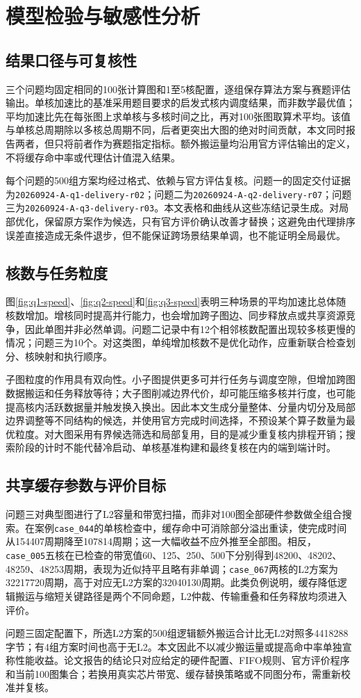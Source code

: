 \section{模型检验与敏感性分析}
\subsection{结果口径与可复核性}
三个问题均固定相同的100张计算图和1至5核配置，逐组保存算法方案与赛题评估输出。单核加速比的基准采用题目要求的启发式核内调度结果，而非数学最优值；平均加速比先在每张图上求单核与多核时间之比，再对100张图取算术平均。该值与单核总周期除以多核总周期不同，后者更突出大图的绝对时间贡献，本文同时报告两者，但只将前者作为赛题指定指标。额外搬运量均沿用官方评估输出的定义，不将缓存命中率或代理估计值混入结果。

每个问题的500组方案均经过格式、依赖与官方评估复核。问题一的固定交付证据为\texttt{20260924-A-q1-delivery-r02}；问题二为\texttt{20260924-A-q2-delivery-r07}；问题三为\texttt{20260924-A-q3-delivery-r03}。本文表格和曲线从这些冻结记录生成。对局部优化，保留原方案作为候选，只有官方评价确认改善才替换；这避免由代理排序误差直接造成无条件退步，但不能保证跨场景结果单调，也不能证明全局最优。

\subsection{核数与任务粒度}
图\ref{fig:q1-speed}、\ref{fig:q2-speed}和\ref{fig:q3-speed}表明三种场景的平均加速比总体随核数增加。增核同时提高并行能力，也会增加跨子图边、同步释放点或共享资源竞争，因此单图并非必然单调。问题二记录中有12个相邻核数配置出现较多核更慢的情况；问题三为10个。对这类图，单纯增加核数不是优化动作，应重新联合检查划分、核映射和执行顺序。

子图粒度的作用具有双向性。小子图提供更多可并行任务与调度空隙，但增加跨图数据搬运和任务释放等待；大子图削减边界代价，却可能压缩多核并行度，也可能提高核内活跃数据量并触发换入换出。因此本文生成分量整体、分量内切分及局部边界调整等不同结构的候选，并使用官方完成时间选择，不预设某个算子数量为最优粒度。对大图采用有界候选筛选和局部复用，目的是减少重复核内排程开销；搜索阶段的计时不能代替冷启动、单核基准构建和最终复核在内的端到端计时。

\subsection{共享缓存参数与评价目标}
问题三对典型图进行了L2容量和带宽扫描，而非对100图全部硬件参数做全组合搜索。在案例\texttt{case\_044}的单核检查中，缓存命中可消除部分溢出重读，使完成时间从154407周期降至107814周期；这一大幅收益不应外推至全部图。相反，\texttt{case\_005}五核在已检查的带宽值60、125、250、500下分别得到48200、48202、48259、48253周期，表现为近似持平且略有非单调；\texttt{case\_067}两核的L2方案为32217720周期，高于对应无L2方案的32040130周期。此类负例说明，缓存降低逻辑搬运与缩短关键路径是两个不同命题，L2仲裁、传输重叠和任务释放均须进入评价。

问题三固定配置下，所选L2方案的500组逻辑额外搬运合计比无L2对照多4418288字节；有4组方案时间也高于无L2。本文因此不以减少搬运量或提高命中率单独宣称性能收益。论文报告的结论只对应给定的硬件配置、FIFO规则、官方评价程序和当前100图集合；若换用真实芯片带宽、缓存替换策略或不同图分布，需重新校准并复核。



